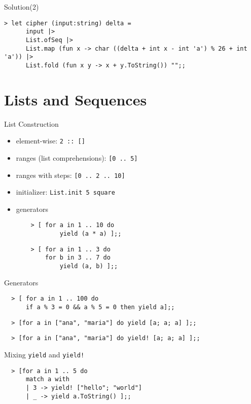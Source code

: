 \documentclass{beamer}
\begin{document}
\begin{frame}[fragile]{Solution(2)}
        \tiny
  \begin{verbatim}
> let cipher (input:string) delta = 
      input |> 
      List.ofSeq |>
      List.map (fun x -> char ((delta + int x - int 'a') % 26 + int 'a')) |>
      List.fold (fun x y -> x + y.ToString()) "";;
  \end{verbatim}
\end{frame}

\section{Lists and Sequences}
\frame{\tableofcontents[currentsection]}

\begin{frame}[fragile]{List Construction}
  \begin{itemize}
    \item element-wise: \texttt{2 :: []}
    \item ranges (list comprehensions): \texttt{[0 .. 5]}
    \item ranges with steps: \texttt{[0 .. 2 .. 10]}
    \item initializer: \texttt{List.init 5 square}
    \item generators
    \begin{verbatim}
    > [ for a in 1 .. 10 do
            yield (a * a) ];;
    \end{verbatim}
    \pause
    \begin{verbatim}
    > [ for a in 1 .. 3 do
        for b in 3 .. 7 do
            yield (a, b) ];;
    \end{verbatim}
  \end{itemize}
\end{frame}

\begin{frame}[fragile]{Generators}
  \begin{verbatim}
  > [ for a in 1 .. 100 do
      if a % 3 = 0 && a % 5 = 0 then yield a];;
  \end{verbatim}
  \pause
  \begin{verbatim}
  > [for a in ["ana", "maria"] do yield [a; a; a] ];;
  \end{verbatim}
  \pause
  \begin{verbatim}
  > [for a in ["ana", "maria"] do yield! [a; a; a] ];;
  \end{verbatim}
\end{frame}

\begin{frame}[fragile]{Mixing \texttt{yield} and \texttt{yield!}}
  \begin{verbatim}
  > [for a in 1 .. 5 do
      match a with
      | 3 -> yield! ["hello"; "world"]
      | _ -> yield a.ToString() ];;
  \end{verbatim}
\end{frame}
\end{document}
